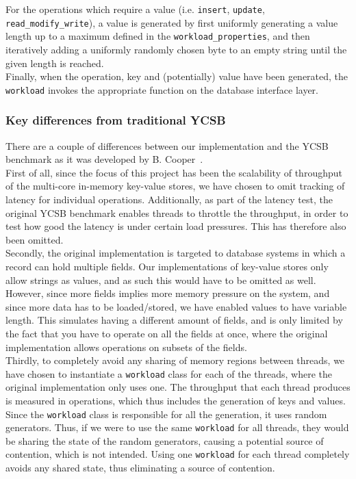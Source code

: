 \documentclass[11pt]{article} %
\begin{document}
For the operations which require a value (i.e. \verb|insert|, \verb|update|, \verb|read_modify_write|), a value is generated by first uniformly generating a value length up to a maximum defined in the \verb|workload_properties|, and then iteratively adding a uniformly randomly chosen byte to an empty string until the given length is reached.\\

Finally, when the operation, key and (potentially) value have been generated, the \verb|workload| invokes the appropriate function on the database interface layer.\\
\subsubsection{Key differences from traditional YCSB}
\label{subsubsec:key_diff_ycsb} 
There are a couple of differences between our implementation and the YCSB benchmark as it was developed by B. Cooper~\cite{BC10}. \\

First of all, since the focus of this project has been the scalability of throughput of the multi-core in-memory key-value stores, we have chosen to omit tracking of latency for individual operations. Additionally, as part of the latency test, the original YCSB benchmark enables threads to throttle the throughput, in order to test how good the latency is under certain load pressures. This has therefore also been omitted. \\

Secondly, the original implementation is targeted to database systems in which a record can hold multiple fields. Our implementations of key-value stores only allow strings as values, and as such this would have to be omitted as well. However, since more fields implies more memory pressure on the system, and since more data has to be loaded/stored, we have enabled values to have variable length. This simulates having a different amount of fields, and is only limited by the fact that you have to operate on all the fields at once, where the original implementation allows operations on subsets of the fields.\\

Thirdly, to completely avoid any sharing of memory regions between threads, we have chosen to instantiate a \verb|workload| class for each of the threads, where the original implementation only uses one. The throughput that each thread produces is measured in operations, which thus includes the generation of keys and values. Since the \verb|workload| class is responsible for all the generation, it uses random generators. Thus, if we were to use the same \verb|workload| for all threads, they would be sharing the state of the random generators, causing a potential source of contention, which is not intended. Using one \verb|workload| for each thread completely avoids any shared state, thus eliminating a source of contention.\\
\end{document}
